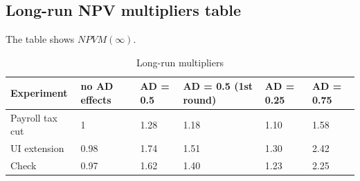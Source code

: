 \documentclass[]{article}
\begin{document}
	


\FloatBarrier
\subsection{Long-run NPV multipliers table}

The table shows $NPVM(\infty)$.

\begin{table}[htb]
	\centering
	\begin{tabular}{@{}llllll@{}}
		\toprule
		Experiment  	& no AD effects & AD = 0.5 		& AD = 0.5 (1st round)	& AD = 0.25 	& AD = 0.75 	\\ \midrule
		Payroll tax cut & 1 			& 1.28   		& 1.18  			    & 1.10			& 1.58			\\
		UI extension    & 0.98 			& 1.74 			& 1.51 					& 1.30			& 2.42			\\
		Check		    & 0.97 			& 1.62 			& 1.40 					& 1.23			& 2.25			\\ \bottomrule
	\end{tabular}	
	\caption{Long-run multipliers}
\end{table}


	
\end{document}
